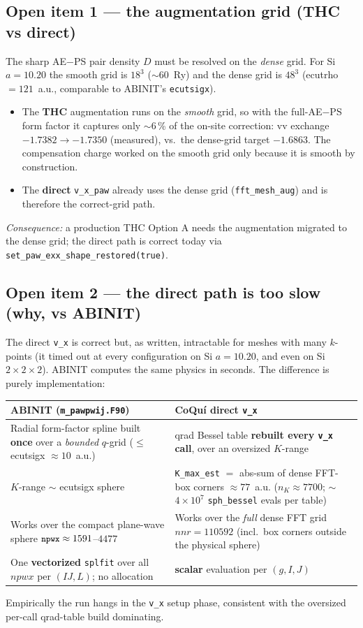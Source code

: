\documentclass[11pt]{article}
\newcommand{\code}[1]{\texttt{\small #1}}
\begin{document}
\subsection*{Open item 1 --- the augmentation grid (THC vs direct)}
The sharp AE$-$PS pair density $D$ must be resolved on the \emph{dense} grid. For Si
$a=10.20$ the smooth grid is $18^3$ ($\sim$60~Ry) and the dense grid is $48^3$
(ecutrho $=121$~a.u., comparable to ABINIT's \code{ecutsigx}).
\begin{itemize}[leftmargin=1.4em]
  \item The \textbf{THC} augmentation runs on the \emph{smooth} grid, so with the
    full-AE$-$PS form factor it captures only $\sim$6\,\% of the on-site correction:
    vv exchange $-1.7382 \to -1.7350$ (measured), vs.\ the dense-grid target
    $-1.6863$. The compensation charge worked on the smooth grid only because it is
    smooth by construction.
  \item The \textbf{direct} \code{v\_x\_paw} already uses the dense grid
    (\code{fft\_mesh\_aug}) and is therefore the correct-grid path.
\end{itemize}
\emph{Consequence:} a production THC Option A needs the augmentation migrated to the
dense grid; the direct path is correct today via \code{set\_paw\_exx\_shape\_restored(true)}.

\subsection*{Open item 2 --- the direct path is too slow (why, vs ABINIT)}
The direct \code{v\_x} is correct but, as written, intractable for meshes with many
$k$-points (it timed out at every configuration on Si $a=10.20$, and even on Si
$2\times2\times2$). ABINIT computes the same physics in seconds. The difference is
purely implementation:
\begin{center}
\begin{tabular}{p{4.6cm}p{4.6cm}}
\toprule
\textbf{ABINIT} (\code{m\_pawpwij.F90}) & \textbf{CoQu\'i direct \code{v\_x}} \\
\midrule
Radial form-factor spline built \textbf{once} over a \emph{bounded} $q$-grid ($\le$
ecutsigx $\approx 10$~a.u.) &
qrad Bessel table \textbf{rebuilt every \code{v\_x} call}, over an oversized
$K$-range \\
$K$-range $\sim$ ecutsigx sphere &
\code{K\_max\_est} $=$ abs-sum of dense FFT-box corners $\approx 77$~a.u.
($n_K \approx 7700$; $\sim$$4\times10^7$ \code{sph\_bessel} evals per table) \\
Works over the compact plane-wave sphere $\code{npwx} \approx 1591$--$4477$ &
Works over the \emph{full} dense FFT grid $nnr = 110592$ (incl.\ box corners outside
the physical sphere) \\
One \textbf{vectorized} \code{splfit} over all $npwx$ per $(IJ,L)$; no allocation &
\textbf{scalar} evaluation per $(g,I,J)$ \\
\bottomrule
\end{tabular}
\end{center}
Empirically the run hangs in the \code{v\_x} setup phase, consistent with the
oversized per-call qrad-table build dominating.
\end{document}
